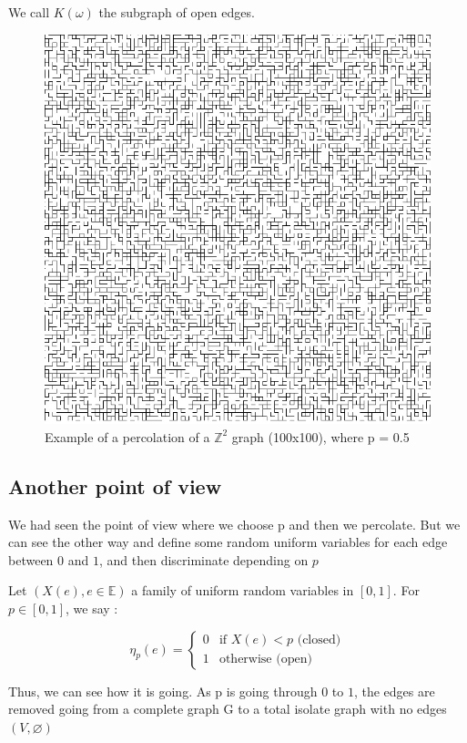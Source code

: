 \documentclass{article}
\begin{document}
We call $K(\omega)$ the subgraph of open edges.

\begin{figure}
\includegraphics[scale=0.75]{percolation0}
\centering

\caption{Example of a percolation of a $\mathbb{Z}^2$ graph (100x100), where p = 0.5}
\end{figure}


\subsection{Another point of view}
We had seen the point of view where we choose p and then we percolate. But we can see the other way and define some random uniform variables for each edge between $0$ and $1$, and then discriminate depending on $p$

Let $(X(e), e\in\mathbb{E})$ a family of uniform random variables in $[0,1]$. For $p \in [0,1]$, we say :

$$
\eta_p(e) = \left\{
    \begin{array}{ll}
        0 & \mbox{if $X(e) < p$ (closed)}\\
        1 & \mbox{otherwise (open)}
    \end{array}
\right.
$$

Thus, we can see how it is going. As p is going through $0$ to $1$, the edges are removed going from a complete graph G to a total isolate graph with no edges $(V, \varnothing)$
\end{document}
